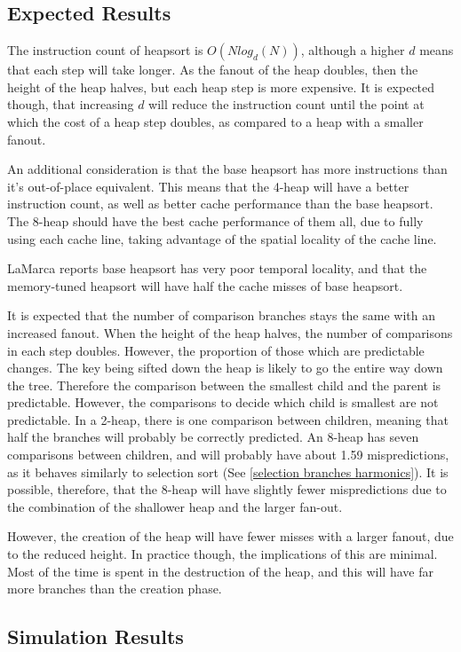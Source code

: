 \subsection{Expected Results}
The instruction count of heapsort is $O(Nlog_d(N))$, although a higher $d$ means
that each step will take longer. As the fanout of the heap doubles, then the
height of the heap halves, but each heap step is more expensive. It is expected
though, that increasing $d$ will reduce the instruction count until the point at
which the cost of a heap step doubles, as compared to a heap with a smaller
fanout.

An additional consideration is that the base heapsort has more instructions than
it's out-of-place equivalent. This means that the 4-heap will have a better
instruction count, as well as better cache performance than the base heapsort.
The 8-heap should have the best cache performance of them all, due to fully
using each cache line, taking advantage of the spatial locality of the cache
line.

LaMarca reports base heapsort has very poor temporal locality, and that the
memory-tuned heapsort will have half the cache misses of base heapsort.

It is expected that the number of comparison branches stays the same with
an increased fanout. When the height of the heap halves, the number of
comparisons in each step doubles. However, the proportion of those which are
predictable changes. The key being sifted down the heap is likely to go the
entire way down the tree. Therefore the comparison between the smallest child
and the parent is predictable. However, the comparisons to decide which child is
smallest are not predictable. In a 2-heap, there is one comparison between
children, meaning that half the branches will probably be correctly predicted.
An 8-heap has seven comparisons between children, and will probably have about
1.59 mispredictions, as it behaves similarly to selection sort (See \ref{selection
branches harmonics}). It is possible, therefore, that the 8-heap will have slightly
fewer mispredictions due to the combination of the shallower heap and the larger
fan-out.

However, the creation of the heap will have fewer misses with a larger fanout,
due to the reduced height. In practice though, the implications of this are
minimal. Most of the time is spent in the destruction of the heap, and this will
have far more branches than the creation phase.

\subsection{Simulation Results}

